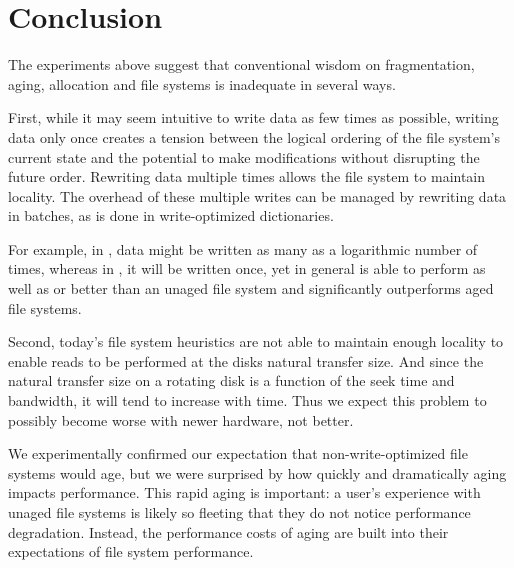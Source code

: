 \section{Conclusion}\label{sec:fsa-conclusion}

The experiments above suggest that conventional wisdom on fragmentation, aging,
allocation and file systems is inadequate in several ways.

First, while it may seem intuitive to write data as few times as possible,
writing data only once creates a tension between the logical ordering
of the file system's current state and the potential to make modifications
without disrupting the future order. Rewriting data
multiple times allows the file system to maintain locality.  The overhead
of these multiple writes can be managed by rewriting data in batches, as is done in
write-optimized dictionaries.


For example, in \betrfs, data might be written as many as a
logarithmic number of times, whereas in \ext, it will be written once,
yet \betrfs in general is able to perform as well as or better than an
unaged \ext file system and significantly outperforms aged \ext file
systems.

Second, today's file system heuristics are not able to maintain enough
locality to enable reads to be performed at the disks natural transfer
size.  And since the natural transfer size on a rotating disk is a
function of the seek time and bandwidth, it will tend to increase with
time. Thus we expect this problem to possibly become worse with newer
hardware, not better.

We experimentally confirmed our expectation that non-write-optimized
file systems would age, but we were surprised by how
quickly and dramatically aging impacts performance.
This rapid aging is important: a user's
experience with unaged
file systems is likely so fleeting that they do not notice performance degradation.
Instead, the performance costs of aging
are built into their expectations of file system performance.


